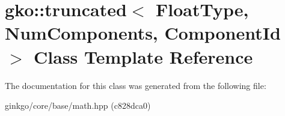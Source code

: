 \hypertarget{classgko_1_1truncated}{}\section{gko\+:\+:truncated$<$ Float\+Type, Num\+Components, Component\+Id $>$ Class Template Reference}
\label{classgko_1_1truncated}


The documentation for this class was generated from the following file\+:\begin{DoxyCompactItemize}
\item 
ginkgo/core/base/math.\+hpp (c828dca0)\end{DoxyCompactItemize}
